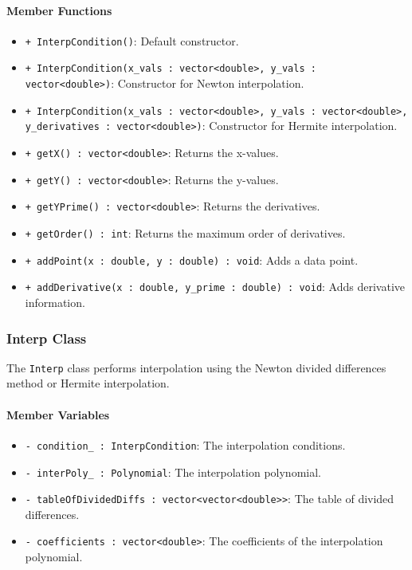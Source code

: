 \documentclass{article}
\begin{document}
\paragraph{Member Functions}

\begin{itemize}
    \item \texttt{+ InterpCondition()}: Default constructor.
    \item \texttt{+ InterpCondition(x\_vals : vector<double>, y\_vals : vector<double>)}: Constructor for Newton interpolation.
    \item \texttt{+ InterpCondition(x\_vals : vector<double>, y\_vals : vector<double>, y\_derivatives : vector<double>)}: Constructor for Hermite interpolation.
    \item \texttt{+ getX() : vector<double>}: Returns the x-values.
    \item \texttt{+ getY() : vector<double>}: Returns the y-values.
    \item \texttt{+ getYPrime() : vector<double>}: Returns the derivatives.
    \item \texttt{+ getOrder() : int}: Returns the maximum order of derivatives.
    \item \texttt{+ addPoint(x : double, y : double) : void}: Adds a data point.
    \item \texttt{+ addDerivative(x : double, y\_prime : double) : void}: Adds derivative information.
\end{itemize}

\subsubsection{Interp Class}

The \texttt{Interp} class performs interpolation using the Newton divided differences method or Hermite interpolation.

\paragraph{Member Variables}

\begin{itemize}
    \item \texttt{- condition\_ : InterpCondition}: The interpolation conditions.
    \item \texttt{- interPoly\_ : Polynomial}: The interpolation polynomial.
    \item \texttt{- tableOfDividedDiffs : vector<vector<double>>}: The table of divided differences.
    \item \texttt{- coefficients : vector<double>}: The coefficients of the interpolation polynomial.
\end{itemize}
\end{document}
